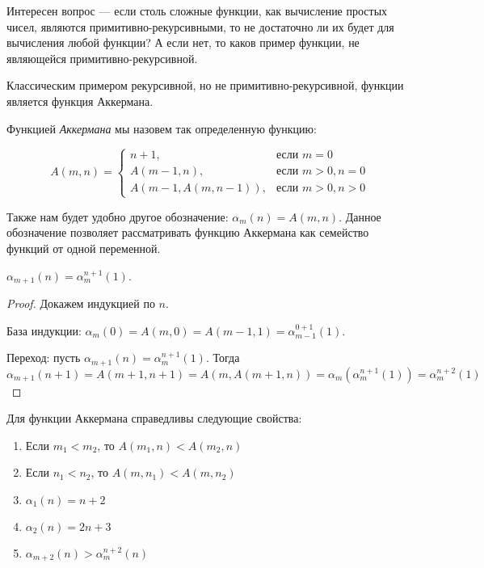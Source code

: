 Интересен вопрос --- если столь сложные функции, как вычисление простых
чисел, являются примитивно-рекурсивными, то не достаточно ли их будет
для вычисления любой функции? А если нет, то каков пример функции, не 
являющейся примитивно-рекурсивной.

Классическим примером рекурсивной, но не примитивно-рекурсивной, функции 
является функция Аккермана.
                    
\begin{definition}Функцией \emph{Аккермана} мы назовем так определенную 
функцию:

$$A(m,n) = \left\{\begin{array}{rl}
   n+1, & \mbox{если $m = 0$}\\
   A(m-1,n), & \mbox{если $m > 0, n = 0$}\\
   A(m-1,A(m,n-1)), & \mbox{если $m > 0, n > 0$}
\end{array}\right.$$

Также нам будет удобно другое обозначение: $\alpha_m(n) = A(m,n)$. 
Данное обозначение позволяет рассматривать функцию Аккермана как семейство
функций от одной переменной.
\end{definition}

\begin{lemma}$\alpha_{m+1}(n) = \alpha^{n+1}_m(1)$.
\end{lemma}
\begin{proof}
Докажем индукцией по $n$. 

База индукции: $\alpha_m(0) = A(m,0) = A(m-1,1) = \alpha^{0+1}_{m-1}(1)$.

Переход: пусть $\alpha_{m+1}(n) = \alpha^{n+1}_m(1)$. Тогда 
$\alpha_{m+1}(n+1) = A(m+1,n+1) = A(m,A(m+1,n)) = \alpha_m(\alpha^{n+1}_m(1)) = 
\alpha^{n+2}_m(1)$
\end{proof}

\begin{lemma}Для функции Аккермана справедливы следующие свойства:
\begin{enumerate}
\item Если $m_1 < m_2$, то $A(m_1,n) < A(m_2,n)$
\item Если $n_1 < n_2$, то $A(m,n_1) < A(m,n_2)$
\item $\alpha_1(n) = n+2$
\item $\alpha_2(n) = 2n+3$
\item $\alpha_{m+2}(n) > \alpha^{n+2}_m(n)$
\end{enumerate}
\end{lemma}

